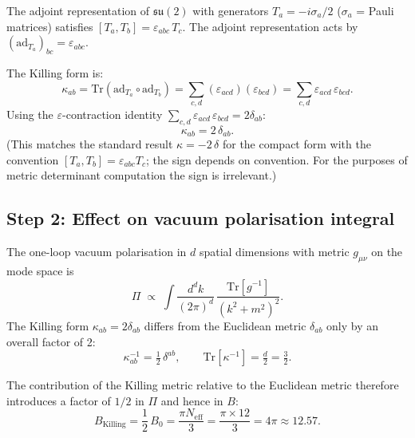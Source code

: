 \documentclass[11pt,a4paper]{article}
\theoremstyle{definition}
\theoremstyle{remark}
\begin{document}
The adjoint representation of $\mathfrak{su}(2)$ with generators
$T_a = -i\sigma_a/2$ ($\sigma_a$ = Pauli matrices) satisfies
$[T_a, T_b] = \varepsilon_{abc}\,T_c$.
The adjoint representation acts by $(\mathrm{ad}_{T_a})_{bc} = \varepsilon_{abc}$.

The Killing form is:
\begin{equation}
  \kappa_{ab}
    = \mathrm{Tr}(\mathrm{ad}_{T_a}\circ\mathrm{ad}_{T_b})
    = \sum_{c,d} (\varepsilon_{acd})(\varepsilon_{bcd})
    = \sum_{c,d} \varepsilon_{acd}\,\varepsilon_{bcd}.
  \label{eq:killing_form}
\end{equation}
Using the $\varepsilon$-contraction identity
$\sum_{c,d}\varepsilon_{acd}\,\varepsilon_{bcd} = 2\delta_{ab}$:
\begin{equation}
  \kappa_{ab} = 2\,\delta_{ab}.
  \label{eq:killing_result}
\end{equation}
(This matches the standard result $\kappa = -2\,\delta$ for the compact form with
the convention $[T_a,T_b]=\varepsilon_{abc}T_c$; the sign depends on convention.
For the purposes of metric determinant computation the sign is irrelevant.)

\subsection{Step 2: Effect on vacuum polarisation integral}

The one-loop vacuum polarisation in $d$ spatial dimensions with metric $g_{\mu\nu}$
on the mode space is
\begin{equation}
  \Pi \;\propto\; \int \frac{d^d k}{(2\pi)^d}\,
    \frac{\mathrm{Tr}[g^{-1}]}{(k^2 + m^2)^2}.
  \label{eq:Pi_general}
\end{equation}
The Killing form $\kappa_{ab} = 2\delta_{ab}$ differs from the Euclidean metric
$\delta_{ab}$ only by an overall factor of 2:
\begin{equation}
  \kappa^{-1}_{ab} = \tfrac{1}{2}\,\delta^{ab},
  \qquad
  \mathrm{Tr}[\kappa^{-1}] = \tfrac{d}{2} = \tfrac{3}{2}.
  \label{eq:killing_inverse}
\end{equation}

The contribution of the Killing metric relative to the Euclidean metric
therefore introduces a factor of $1/2$ in $\Pi$ and hence in $B$:
\begin{equation}
  B_{\mathrm{Killing}} = \frac{1}{2}\,B_0 = \frac{\pi N_{\mathrm{eff}}}{3}
    = \frac{\pi \times 12}{3} = 4\pi \approx 12.57.
  \label{eq:B_killing}
\end{equation}
\end{document}
